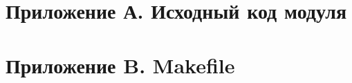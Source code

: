 \chapter*{Приложение А. Исходный код модуля}
\label{chp:attachment-a}



\chapter*{Приложение B. Makefile}
\label{chp:attachment-b}


